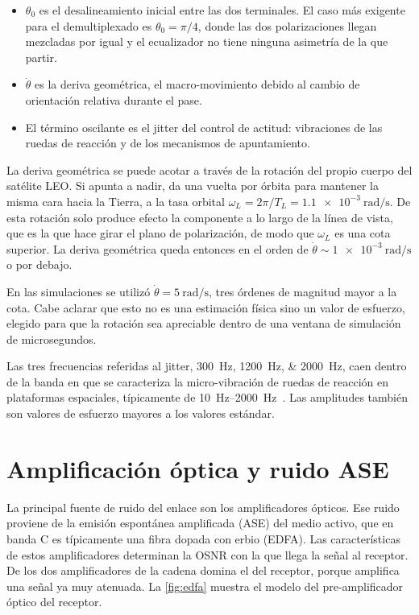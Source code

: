 \begin{itemize}\itemsep2pt
  \item $\theta_0$ es el desalineamiento inicial entre las dos terminales. El
        caso m\'as exigente para el demultiplexado es $\theta_0=\pi/4$, donde
        las dos polarizaciones llegan mezcladas por igual y el ecualizador no
        tiene ninguna asimetr\'ia de la que partir.
  \item $\dot\theta$ es la deriva geom\'etrica, el macro-movimiento
        debido al cambio de orientaci\'on relativa durante el pase.
  \item El t\'ermino oscilante es el jitter del control de actitud:
        vibraciones de las ruedas de reacci\'on y de los mecanismos de
        apuntamiento.
\end{itemize}

La deriva geom\'etrica se puede acotar a trav\'es de la rotaci\'on del propio cuerpo del sat\'elite LEO. Si apunta a
nadir, da una vuelta por \'orbita para mantener la misma cara hacia la Tierra,
a la tasa orbital $\omega_L = 2\pi/T_L = \SI{1.1e-3}{\radian\per\second}$. De
esta rotaci\'on solo produce efecto la componente a lo largo de la l\'inea de vista, que
es la que hace girar el plano de polarizaci\'on, de modo que $\omega_L$ es una
cota superior. La deriva geom\'etrica queda entonces en el orden de
$\dot\theta \sim \SI{1e-3}{\radian\per\second}$ o por debajo.

En las simulaciones se utiliz\'o
$\dot\theta = \SI{5}{\radian\per\second}$, tres \'ordenes de magnitud mayor a la cota. Cabe
aclarar que esto no es una estimaci\'on f\'isica sino un valor de esfuerzo,
elegido para que la rotaci\'on sea apreciable dentro de una ventana de
simulaci\'on de microsegundos.

Las tres frecuencias referidas al jitter, \SIlist{300;1200;2000}{\hertz}, caen dentro de la banda en que se caracteriza
la micro-vibraci\'on de ruedas de reacci\'on en plataformas espaciales,
t\'ipicamente de \SIrange{10}{2000}{\hertz}~\cite{microvib2018}. Las
amplitudes tambi\'en son valores de esfuerzo mayores a los valores est\'andar.

\section{Amplificaci\'on \'optica y ruido ASE}
\label{sec:canal-ase}

La principal fuente de ruido del enlace son los amplificadores \'opticos. Ese
ruido proviene de la emisi\'on espont\'anea amplificada (ASE) del medio
activo, que en banda C es t\'ipicamente una fibra dopada con erbio (EDFA). Las
caracter\'isticas de estos amplificadores determinan la OSNR con la que llega
la se\~nal al receptor. De los dos amplificadores de la cadena domina el del receptor, porque
amplifica una se\~nal ya muy atenuada. La \cref{fig:edfa} muestra el modelo
del pre-amplificador \'optico del receptor.

